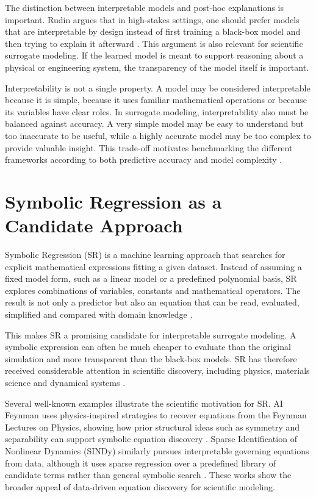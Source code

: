 \documentclass[12pt,oneside,bibtotoc,liststotoc]{scrbook}
\begin{document}
The distinction between interpretable models and post-hoc explanations is important. Rudin argues that in high-stakes settings, one should prefer models that are interpretable by design instead of first training a black-box model and then trying to explain it afterward \cite{rudin2019stop}. This argument is also relevant for scientific surrogate modeling. If the learned model is meant to support reasoning about a physical or engineering system, the transparency of the model itself is important.

Interpretability is not a single property. A model may be considered interpretable because it is simple, because it uses familiar mathematical operations or because its variables have clear roles. In surrogate modeling, interpretability also must be balanced against accuracy. A very simple model may be easy to understand but too inaccurate to be useful, while a highly accurate model may be too complex to provide valuable insight. This trade-off motivates benchmarking the different frameworks according to both predictive accuracy and model complexity \cite{lacava2021contemporary,defranca2025srbench}.

\section{Symbolic Regression as a Candidate Approach}

Symbolic Regression (SR) is a machine learning approach that searches for explicit mathematical expressions fitting a given dataset. Instead of assuming a fixed model form, such as a linear model or a predefined polynomial basis, SR explores combinations of variables, constants and mathematical operators. The result is not only a predictor but also an equation that can be read, evaluated, simplified and compared with domain knowledge \cite{makke2024interpretable,dong2025recent}.

This makes SR a promising candidate for interpretable surrogate modeling. A symbolic expression can often be much cheaper to evaluate than the original simulation and more transparent than the black-box models. SR has therefore received considerable attention in scientific discovery, including physics, materials science and dynamical systems \cite{angelis2023artificial,guo2024harnessing,wang2024exploring,brum2026discovering}.

Several well-known examples illustrate the scientific motivation for SR. AI Feynman uses physics-inspired strategies to recover equations from the Feynman Lectures on Physics, showing how prior structural ideas such as symmetry and separability can support symbolic equation discovery \cite{udrescu2020ai}. Sparse Identification of Nonlinear Dynamics (SINDy) similarly pursues interpretable governing equations from data, although it uses sparse regression over a predefined library of candidate terms rather than general symbolic search \cite{brunton2016discovering}. These works show the broader appeal of data-driven equation discovery for scientific modeling.
\end{document}
